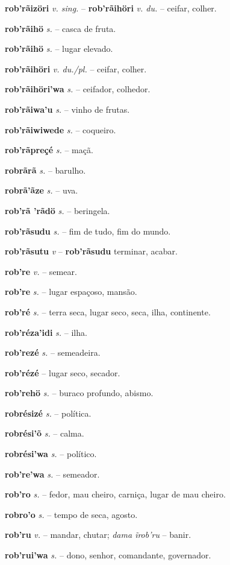 \textbf{rob'rãizöri} \textit{v. sing.} -- \textbf{rob'rãihöri} \textit{v. du.} -- ceifar, colher.

\textbf{rob'rãihö} \textit{s.} -- casca de fruta.

\textbf{rob'rãihö} \textit{s.} -- lugar elevado.

\textbf{rob'rãihöri} \textit{v. du./pl.} -- ceifar, colher.

\textbf{rob'rãihöri'wa} \textit{s.} -- ceifador, colhedor.

\textbf{rob'rãiwa'u} \textit{s.} -- vinho de frutas.

\textbf{rob'rãiwiwede} \textit{s.} -- coqueiro.

\textbf{rob'rãpreçé} \textit{s.} -- maçã.

\textbf{robrãrã} \textit{s.} -- barulho.

\textbf{robrã'ãze} \textit{s.} -- uva.

\textbf{rob'rã 'rãdö} \textit{s.} -- beringela.

\textbf{rob'rãsudu} \textit{s.} -- fim de tudo, fim do mundo.

\textbf{rob'rãsutu} \textit{v} -- \textbf{rob'rãsudu} terminar, acabar.

\textbf{rob're} \textit{v.} -- semear.

\textbf{rob're} \textit{s.} -- lugar espaçoso, mansão.

\textbf{rob'ré} \textit{s.} -- terra seca, lugar seco, seca, ilha, continente.

\textbf{rob'réza'idi} \textit{s.} -- ilha.

\textbf{rob'rezé} \textit{s.} -- semeadeira.

\textbf{rob'rézé} \textit{} -- lugar seco, secador.

\textbf{rob'rehö} \textit{s.} -- buraco profundo, abismo.

\textbf{robrésizé} \textit{s.} -- política.

\textbf{robrési'õ} \textit{s.} -- calma.

\textbf{robrési'wa} \textit{s.} -- político.

\textbf{rob're'wa} \textit{s.} -- semeador.

\textbf{rob'ro} \textit{s.} -- fedor, mau cheiro, carniça, lugar de mau cheiro.

\textbf{robro'o} \textit{s.} -- tempo de seca, agosto.

\textbf{rob'ru} \textit{v.} -- mandar, chutar; \textit{dama ĩrob'ru} -- banir.

\textbf{rob'rui'wa} \textit{s.} -- dono, senhor, comandante, governador.

